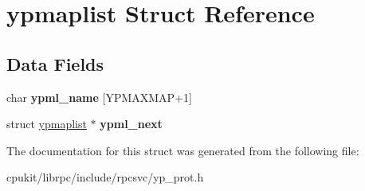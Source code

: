 \hypertarget{structypmaplist}{}\section{ypmaplist Struct Reference}
\label{structypmaplist}
\subsection*{Data Fields}
\begin{DoxyCompactItemize}
\item 
\mbox{\label{structypmaplist_a29c199e2b52db5752c15fead83f54f0b}} 
char {\bfseries ypml\+\_\+name} \mbox{[}Y\+P\+M\+A\+X\+M\+AP+1\mbox{]}
\item 
\mbox{\label{structypmaplist_a856a4c1d043723f85a71a0d32ed9fd28}} 
struct \mbox{\hyperlink{structypmaplist}{ypmaplist}} $\ast$ {\bfseries ypml\+\_\+next}
\end{DoxyCompactItemize}


The documentation for this struct was generated from the following file\+:\begin{DoxyCompactItemize}
\item 
cpukit/librpc/include/rpcsvc/yp\+\_\+prot.\+h\end{DoxyCompactItemize}
